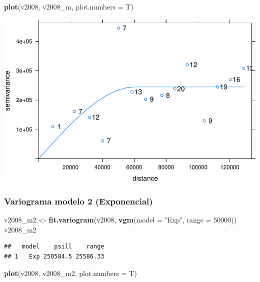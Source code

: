 \documentclass[11pt,]{article}
\newenvironment{Shaded}{\begin{snugshade}}{\end{snugshade}}
\newcommand{\KeywordTok}[1]{\textcolor[rgb]{0.13,0.29,0.53}{\textbf{#1}}}
\newcommand{\DataTypeTok}[1]{\textcolor[rgb]{0.13,0.29,0.53}{#1}}
\newcommand{\DecValTok}[1]{\textcolor[rgb]{0.00,0.00,0.81}{#1}}
\newcommand{\StringTok}[1]{\textcolor[rgb]{0.31,0.60,0.02}{#1}}
\newcommand{\NormalTok}[1]{#1}
\begin{document}
\begin{Shaded}
\begin{Highlighting}[]
\KeywordTok{plot}\NormalTok{(v2008, v2008_m, }\DataTypeTok{plot.numbers =}\NormalTok{ T)}
\end{Highlighting}
\end{Shaded}

\includegraphics{proyecto_files/figure-latex/unnamed-chunk-32-1.pdf}

\subsubsection{Variograma modelo 2
(Exponencial)}\label{variograma-modelo-2-exponencial-1}

\begin{Shaded}
\begin{Highlighting}[]
\NormalTok{v2008_m2 <-}\StringTok{ }\KeywordTok{fit.variogram}\NormalTok{(v2008, }\KeywordTok{vgm}\NormalTok{(}\DataTypeTok{model =} \StringTok{"Exp"}\NormalTok{, }\DataTypeTok{range =} \DecValTok{50000}\NormalTok{))}
\NormalTok{v2008_m2}
\end{Highlighting}
\end{Shaded}

\begin{verbatim}
##   model    psill    range
## 1   Exp 250584.5 25586.33
\end{verbatim}

\begin{Shaded}
\begin{Highlighting}[]
\KeywordTok{plot}\NormalTok{(v2008, v2008_m2, }\DataTypeTok{plot.numbers =}\NormalTok{ T)}
\end{Highlighting}
\end{Shaded}
\end{document}
